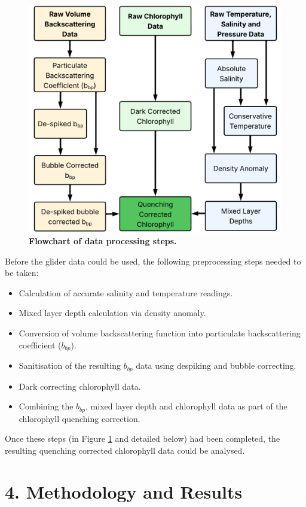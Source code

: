 \documentclass[
	a4paper, %
	10pt, %
	unnumberedsections, %
	twoside, %
]{LTJournalArticle}
\begin{document}
\begin{multicols}{2}
\begin{figure}[H] %
	\includegraphics[width=\linewidth]{Louis/figures/figureJ.png}
	\caption{\textbf{Flowchart of data processing steps.}}
	\label{fig:J}
\end{figure}

Before the glider data could be used, the following preprocessing steps needed to be taken:
\begin{itemize}
	\item Calculation of accurate salinity and temperature readings.
	\item Mixed layer depth calculation via density anomaly. 
	\item Conversion of volume backscattering function into particulate backscattering coefficient ($b_{bp}$).
	\item Sanitisation of the resulting $b_{bp}$ data using despiking and bubble correcting.
	\item Dark correcting chlorophyll data.
	\item Combining the $b_{bp}$, mixed layer depth and chlorophyll data as part of the chlorophyll quenching correction.
\end{itemize}

Once these steps (in Figure \ref{fig:J} and detailed below) had been completed, the resulting quenching corrected chlorophyll data could be analysed.

\section{4. Methodology and Results}


\end{multicols}
\end{document}
